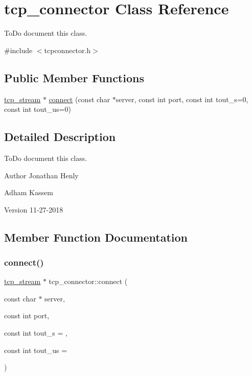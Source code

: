 \hypertarget{classtcp__connector}{}\section{tcp\+\_\+connector Class Reference}
\label{classtcp__connector}


To\+Do document this class.  




{\ttfamily \#include $<$tcpconnector.\+h$>$}

\subsection*{Public Member Functions}
\begin{DoxyCompactItemize}
\item 
\hyperlink{classtcp__stream}{tcp\+\_\+stream} $\ast$ \hyperlink{classtcp__connector_a1f542ff6507a639154099b4c2dafb729}{connect} (const char $\ast$server, const int port, const int tout\+\_\+s=0, const int tout\+\_\+us=0)
\end{DoxyCompactItemize}


\subsection{Detailed Description}
To\+Do document this class. 

\begin{DoxyAuthor}{Author}
Jonathan Henly 

Adham Kassem 
\end{DoxyAuthor}
\begin{DoxyVersion}{Version}
11-\/27-\/2018 
\end{DoxyVersion}


\subsection{Member Function Documentation}
\mbox{\label{classtcp__connector_a1f542ff6507a639154099b4c2dafb729}} 
\subsubsection{\texorpdfstring{connect()}{connect()}}
{\footnotesize\ttfamily \hyperlink{classtcp__stream}{tcp\+\_\+stream} $\ast$ tcp\+\_\+connector\+::connect (\begin{DoxyParamCaption}\item[{const char $\ast$}]{server,  }\item[{const int}]{port,  }\item[{const int}]{tout\+\_\+s = {},  }\item[{const int}]{tout\+\_\+us = {} }\end{DoxyParamCaption})}

